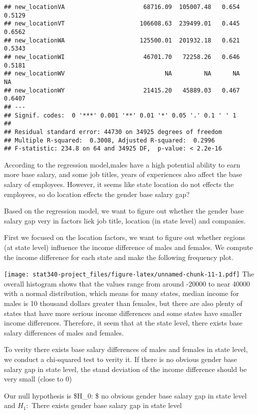 \documentclass[
]{article}
\begin{document}
\begin{verbatim}
## new_locationVA                      68716.09  105007.48   0.654   0.5129    
## new_locationVT                     106608.63  239499.01   0.445   0.6562    
## new_locationWA                     125500.01  201932.18   0.621   0.5343    
## new_locationWI                      46701.70   72258.26   0.646   0.5181    
## new_locationWV                            NA         NA      NA       NA    
## new_locationWY                      21415.20   45889.03   0.467   0.6407    
## ---
## Signif. codes:  0 '***' 0.001 '**' 0.01 '*' 0.05 '.' 0.1 ' ' 1
## 
## Residual standard error: 44730 on 34925 degrees of freedom
## Multiple R-squared:  0.3008, Adjusted R-squared:  0.2996 
## F-statistic: 234.8 on 64 and 34925 DF,  p-value: < 2.2e-16
\end{verbatim}

According to the regression model,males have a high potential ability to
earn more base salary, and some job titles, years of experiences also
affect the base salary of employees. However, it seems like state
location do not effects the employees, so do location effects the gender
base salary gap?

Based on the regression model, we want to figure out whether the gender
base salary gap very in factors liek job title, location (in state
level) and companies.

First we focused on the location factors, we want to figure out whether
regions (at state level) influence the income difference of males and
females. We compute the income difference for each state and make the
following frequency plot.

\texttt{[image: stat340-project\_files/figure-latex/unnamed-chunk-11-1.pdf]}
The overall histogram shows that the values range from around -20000 to
near 40000 with a normal distribution, which means for many states,
median income for males is 10 thousand dollars greater than females, but
there are also plenty of states that have more serious income
differences and some states have smaller income differences. Therefore,
it seem that at the state level, there exists base salary differences of
males and females.

To verity there exists base salary differences of males and females in
state level, we conduct a chi-squared test to verity it. If there is no
obvious gender base salary gap in state level, the stand deviation of
the income difference should be very small (close to 0)

Our null hypothesis is \$H\_0: \$ no obvious gender base salary gap in
state level and \(H_1:\) There exists gender base salary gap in state
level
\end{document}
